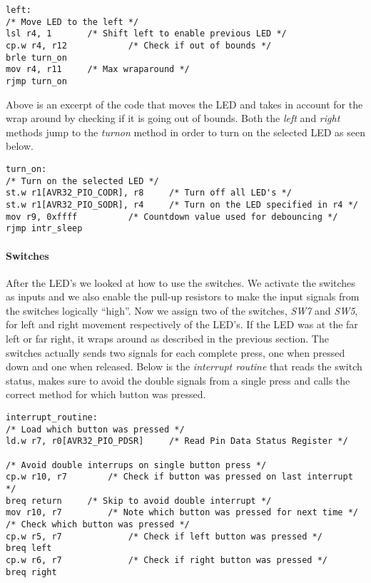 \documentclass[a4paper,11pt]{article}
\begin{document}
\begin{lstlisting}
left:
/* Move LED to the left */
lsl r4, 1		/* Shift left to enable previous LED */
cp.w r4, r12        	/* Check if out of bounds */
brle turn_on
mov r4, r11		/* Max wraparound */
rjmp turn_on
\end{lstlisting}

Above is an excerpt of the code that moves the LED and takes in account for the wrap around by checking if it is going out of bounds. Both the \emph{left} and \emph{right} methods jump to the \emph{turnon} method in order to turn on the selected LED as seen below.

\begin{lstlisting}
turn_on:
/* Turn on the selected LED */
st.w r1[AVR32_PIO_CODR], r8    	/* Turn off all LED's */
st.w r1[AVR32_PIO_SODR], r4    	/* Turn on the LED specified in r4 */
mov r9, 0xffff			/* Countdown value used for debouncing */
rjmp intr_sleep
\end{lstlisting}

\paragraph{Switches}
After the LED's we looked at how to use the switches. We activate the switches as inputs and we also enable the pull-up resistors to make the input signals from the switches logically “high”. Now we assign two of the switches, \emph{SW7} and \emph{SW5}, for left and right movement respectively of the LED’s. If the LED was at the far left or far right, it wraps around as described in the previous section. The switches actually sends two signals for each complete press, one when pressed down and one when released. Below is the \emph{interrupt routine} that reads the switch status, makes sure to avoid the double signals from a single press and calls the correct method for which button was pressed.

\begin{lstlisting}
interrupt_routine:	
/* Load which button was pressed */ 
ld.w r7, r0[AVR32_PIO_PDSR]  	/* Read Pin Data Status Register */   

/* Avoid double interrups on single button press */
cp.w r10, r7 		/* Check if button was pressed on last interrupt */
breq return		/* Skip to avoid double interrupt */
mov r10, r7 		/* Note which button was pressed for next time */			
/* Check which button was pressed */
cp.w r5, r7             /* Check if left button was pressed */
breq left
cp.w r6, r7             /* Check if right button was pressed */
breq right
\end{lstlisting}
\end{document}
